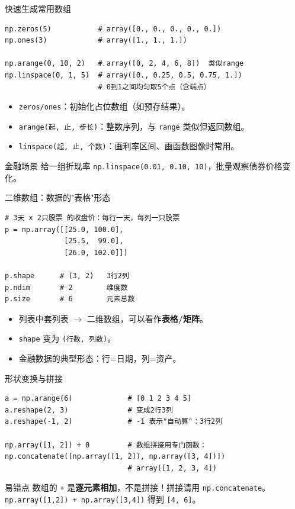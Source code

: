 \documentclass[9pt]{ctexbeamer}
\begin{document}
\begin{frame}[fragile]{快速生成常用数组}
	\begin{lstlisting}
np.zeros(5)           # array([0., 0., 0., 0., 0.])
np.ones(3)            # array([1., 1., 1.])

np.arange(0, 10, 2)   # array([0, 2, 4, 6, 8])  类似range
np.linspace(0, 1, 5)  # array([0., 0.25, 0.5, 0.75, 1.])
                      # 0到1之间均匀取5个点（含端点）
\end{lstlisting}
	\begin{itemize}
		\item \texttt{zeros/ones}：初始化占位数组（如预存结果）。
		\item \texttt{arange(起, 止, 步长)}：整数序列，与 \texttt{range} 类似但返回数组。
		\item \texttt{linspace(起, 止, 个数)}：画利率区间、画函数图像时常用。
	\end{itemize}
	\begin{exampleblock}{金融场景}
		给一组折现率 \texttt{np.linspace(0.01, 0.10, 10)}，批量观察债券价格变化。
	\end{exampleblock}
\end{frame}

\begin{frame}[fragile]{二维数组：数据的"表格"形态}
	\begin{lstlisting}
# 3天 x 2只股票 的收盘价：每行一天，每列一只股票
p = np.array([[25.0, 100.0],
              [25.5,  99.0],
              [26.0, 102.0]])

p.shape      # (3, 2)   3行2列
p.ndim       # 2        维度数
p.size       # 6        元素总数
\end{lstlisting}
	\begin{itemize}
		\item 列表中套列表 $\rightarrow$ 二维数组，可以看作\textbf{表格/矩阵}。
		\item \texttt{shape} 变为 \texttt{(行数, 列数)}。
		\item 金融数据的典型形态：\alert{行=日期，列=资产}。
	\end{itemize}
\end{frame}

\begin{frame}[fragile]{形状变换与拼接}
	\begin{lstlisting}
a = np.arange(6)             # [0 1 2 3 4 5]
a.reshape(2, 3)              # 变成2行3列
a.reshape(-1, 2)             # -1 表示"自动算"：3行2列

np.array([1, 2]) + 0         # 数组拼接用专门函数：
np.concatenate([np.array([1, 2]), np.array([3, 4])])
                             # array([1, 2, 3, 4])
\end{lstlisting}
	\begin{alertblock}{易错点}
		数组的 \texttt{+} 是\textbf{逐元素相加}，不是拼接！拼接请用 \texttt{np.concatenate}。\\
		\texttt{np.array([1,2]) + np.array([3,4])} 得到 \texttt{[4, 6]}。
	\end{alertblock}
\end{frame}
\end{document}
